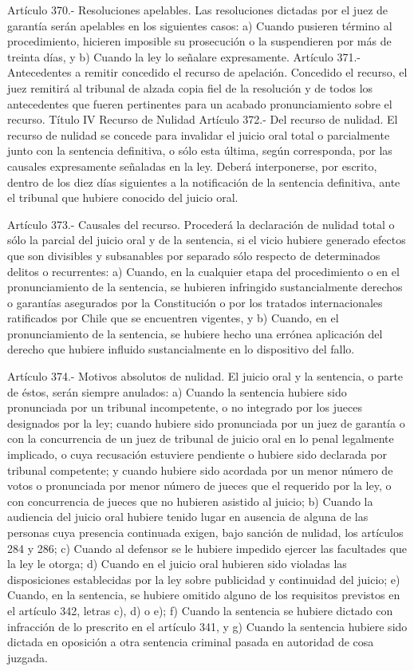     Artículo 370.- Resoluciones apelables. Las resoluciones dictadas por el juez de garantía serán apelables en los siguientes casos:
    a) Cuando pusieren término al procedimiento, hicieren imposible su prosecución o la suspendieren por más de treinta días, y
    b) Cuando la ley lo señalare expresamente.
    Artículo 371.- Antecedentes a remitir concedido el recurso de apelación. Concedido el recurso, el juez remitirá al tribunal de alzada copia fiel de la resolución y de todos los antecedentes que fueren pertinentes para un acabado pronunciamiento sobre el recurso.
    Título IV
    Recurso de Nulidad
    Artículo 372.- Del recurso de nulidad. El recurso de nulidad se concede para invalidar el juicio oral total o parcialmente junto con la sentencia definitiva, o sólo esta última, según corresponda, por las causales expresamente señaladas en la ley.
    Deberá interponerse, por escrito, dentro de los diez días siguientes a la notificación de la sentencia definitiva, ante el tribunal que hubiere conocido del juicio oral.

    Artículo 373.- Causales del recurso. Procederá la declaración de nulidad total o sólo la parcial del juicio oral y de la sentencia, si el vicio hubiere generado efectos que son divisibles y subsanables por separado sólo respecto de determinados delitos o recurrentes:
    a) Cuando, en la cualquier etapa del procedimiento
o en el pronunciamiento de la sentencia, se hubieren
infringido sustancialmente derechos o garantías
asegurados por la Constitución o por los tratados
internacionales ratificados por Chile que se encuentren
vigentes, y
    b) Cuando, en el pronunciamiento de la sentencia,
se hubiere hecho una errónea aplicación del derecho que
hubiere influido sustancialmente en lo dispositivo del
fallo.


    Artículo 374.- Motivos absolutos de nulidad. El juicio oral y la sentencia, o parte de éstos, serán siempre anulados:
    a) Cuando la sentencia hubiere sido pronunciada por un tribunal incompetente, o no integrado por los jueces designados por la ley; cuando hubiere sido pronunciada por un juez de garantía o con la concurrencia de un juez de tribunal de juicio oral en lo penal legalmente implicado, o cuya recusación estuviere pendiente o hubiere sido declarada por tribunal competente; y cuando hubiere sido acordada por un menor número de votos o pronunciada por menor número de jueces que el requerido por la ley, o con concurrencia de jueces que no hubieren asistido al juicio;
    b) Cuando la audiencia del juicio oral hubiere tenido lugar en ausencia de alguna de las personas cuya presencia continuada exigen, bajo sanción de nulidad, los artículos 284 y 286;
    c) Cuando al defensor se le hubiere impedido ejercer las facultades que la ley le otorga;
    d) Cuando en el juicio oral hubieren sido violadas las disposiciones establecidas por la ley sobre publicidad y continuidad del juicio;
    e) Cuando, en la sentencia, se hubiere omitido alguno de los requisitos previstos en el artículo 342, letras c), d) o e);
    f) Cuando la sentencia se hubiere dictado con infracción de lo prescrito en el artículo 341, y g) Cuando la sentencia hubiere sido dictada en oposición a otra sentencia criminal pasada en autoridad de cosa juzgada.

